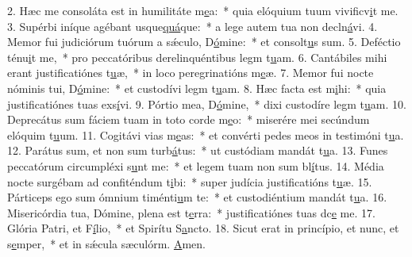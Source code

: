 2. Hæc me consoláta est in humilitáte m\uline{e}a:~* quia elóquium tuum vivificv\uline{i}t me.
3. Supérbi iníque agébant usque\uline{quá}que:~* a lege autem tua non decln\uline{á}vi.
4. Memor fui judiciórum tuórum a sǽculo, D\uline{ó}mine:~* et consolt\uline{u}s sum.
5. Deféctio ténu\uline{i}t me,~* pro peccatóribus derelinquéntibus legm t\uline{u}am.
6. Cantábiles mihi erant justificatiónes t\uline{u}æ,~* in loco peregrinatións m\uline{e}æ.
7. Memor fui nocte nóminis tui, D\uline{ó}mine:~* et custodívi legm t\uline{u}am.
8. Hæc facta est m\uline{i}hi:~* quia justificatiónes tuas exs\uline{í}vi.
9. Pórtio mea, D\uline{ó}mine,~* dixi custodíre legm t\uline{u}am.
10. Deprecátus sum fáciem tuam in toto corde m\uline{e}o:~* miserére mei secúndum elóquim t\uline{u}um.
11. Cogitávi vias m\uline{e}as:~* et convérti pedes meos in testimóni t\uline{u}a.
12. Parátus sum, et non sum turb\uline{á}tus:~* ut custódiam mandát t\uline{u}a.
13. Funes peccatórum circumpléxi s\uline{u}nt me:~* et legem tuam non sum bl\uline{í}tus.
14. Média nocte surgébam ad confiténdum t\uline{i}bi:~* super judícia justificatións t\uline{u}æ.
15. Párticeps ego sum ómnium timénti\uline{u}m te:~* et custodiéntium mandát t\uline{u}a.
16. Misericórdia tua, Dómine, plena est t\uline{e}rra:~* justificatiónes tuas dc\uline{e} me.
17. Glória Patri, et F\uline{í}lio,~* et Spirítu S\uline{a}ncto.
18. Sicut erat in princípio, et nunc, et s\uline{e}mper,~* et in sǽcula sæculórm. \uline{A}men.
